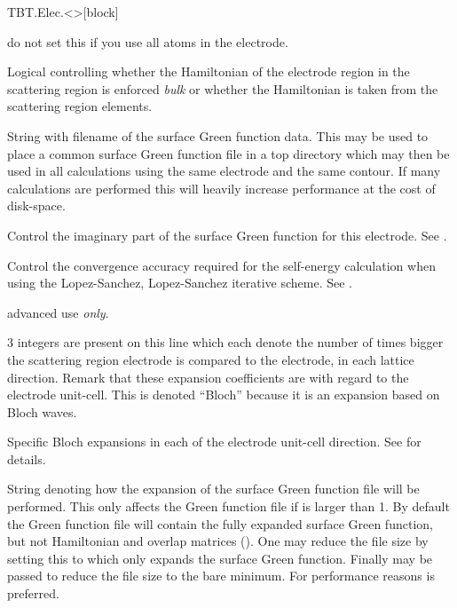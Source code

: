 \begin{fdfentry}{TBT.Elec.<>}[block]
\begin{fdfoptions}
    \note do not set this if you use all atoms in the electrode.

    \option[Bulk]%
    Logical controlling whether the Hamiltonian of the electrode
    region in the scattering region is enforced \emph{bulk} or whether
    the Hamiltonian is taken from the scattering region elements.

    \option[tbt.Gf/Gf]%
    String with filename of the surface Green function data. This may
    be used to place a common surface Green function file in a top
    directory which may then be used in all calculations using the
    same electrode and the same contour. 
    If many calculations are performed this will heavily increase
    performance at the cost of disk-space.

    
    Control the imaginary part of the surface Green function for this
    electrode. See .

    Control the convergence accuracy required for the self-energy
    calculation when using the Lopez-Sanchez, Lopez-Sanchez iterative
    scheme.
    See .

    \note advanced use \emph{only}.

    \option[Bloch]%
    $3$ integers are present on this line which each denote the number
    of times bigger the scattering region electrode is compared to the
    electrode, in each lattice direction. Remark that these expansion
    coefficients are with regard to the electrode unit-cell.
    This is denoted ``Bloch'' because it is an expansion based on
    Bloch waves.

    \option[Bloch-A/a1|B/a2|C/a3]%
    Specific Bloch expansions in each of the electrode unit-cell
    direction. See  for details.

    String denoting how the expansion of the surface Green function
    file will be performed. This only affects the Green function file
    if  is larger than 1. By default the Green function
    file will contain the fully expanded surface Green function, but
    not Hamiltonian and overlap matrices (). One may
    reduce the file size by setting this to  which only
    expands the surface Green function. Finally  may be
    passed to reduce the file size to the bare minimum.
    For performance reasons  is preferred. 


\end{fdfoptions}
\end{fdfentry}
